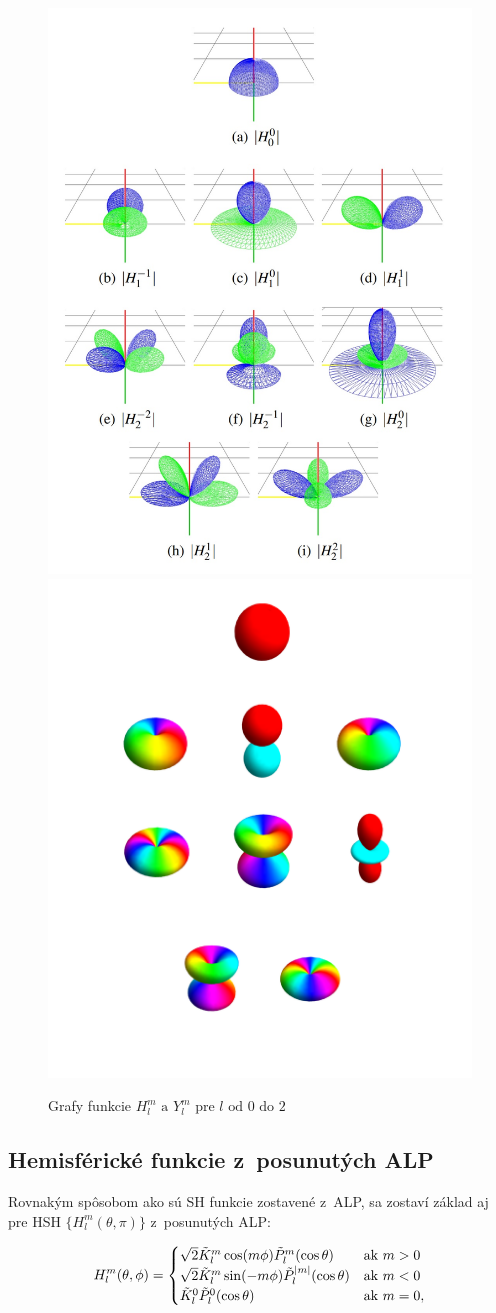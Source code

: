 \begin{figure}[!t]
    \centering
    \includegraphics[width=0.35\linewidth]{obrazky-figures/HSH.jpg}
    \includegraphics[width=0.35\linewidth]{obrazky-figures/SH2.png}
    \caption{Grafy funkcie $H_l^m \text{ a } Y_l^m$ pre $l \text{ od } 0 \text{ do } 2$\cite{HSH}\cite{SHimg}}
    \label{HSH}
\end{figure}

\subsection*{Hemisférické funkcie z~posunutých ALP}
Rovnakým spôsobom ako sú SH funkcie zostavené z~ALP, sa zostaví základ aj pre HSH \cite{HSH} $\{H^m_l(\theta, \pi)\}$ z~posunutých ALP:

\begin{equation} \label{HSHA}
        H^m_l(\theta, \phi) = 
    \begin{cases}
        \sqrt{2}\Tilde{K}^m_l\cos(m\phi)\Tilde{P}^m_l(\cos\theta) & \text{ak } m > 0 \\
        \sqrt{2}\Tilde{K}^m_l\sin(-m\phi)\Tilde{P}^{|m|}_l(\cos\theta) & \text{ak } m < 0 \\
        \Tilde{K}^0_l\Tilde{P}^0_l(\cos\theta) & \text{ak } m = 0,
    \end{cases}
\end{equation}

